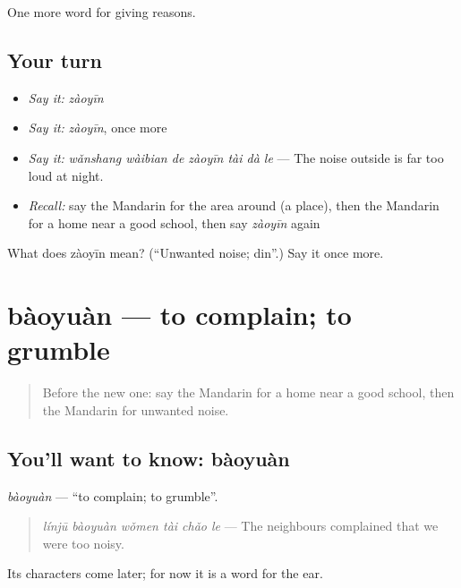 \begin{grammarlens}[title={What you've built}]
One more word for giving reasons.
\end{grammarlens}

\subsection*{Your turn}
\begin{itemize}
\raggedright
  \item \emph{Say it:} \emph{zàoyīn}
  \item \emph{Say it:} \emph{zàoyīn}, once more
  \item \emph{Say it:} \emph{wǎnshang wàibian de zàoyīn tài dà le} — The noise outside is far too loud at night.
  \item \emph{Recall:} say the Mandarin for the area around (a place), then the Mandarin for a home near a good school, then say \emph{zàoyīn} again
\end{itemize}

\begin{tcolorbox}[breakable,colback=teal!4,colframe=teal!35!black,title={Before you move on}]
What does zàoyīn mean? (\textquotedblleft{}Unwanted noise; din\textquotedblright{}.) Say it once more.
\end{tcolorbox}
\section[bàoyuàn]{bàoyuàn — to complain; to grumble}

\label{lesson:ZH-C378-baoyuan}



\begin{quote}
Before the new one: say the Mandarin for a home near a good school, then the Mandarin for unwanted noise.
\end{quote}

\subsection*{You'll want to know: bàoyuàn}
\emph{bàoyuàn} — \textquotedblleft{}to complain; to grumble\textquotedblright{}.

\begin{quote}
\emph{línjū bàoyuàn wǒmen tài chǎo le} — The neighbours complained that we were too noisy.
\end{quote}

Its characters come later; for now it is a word for the ear.

